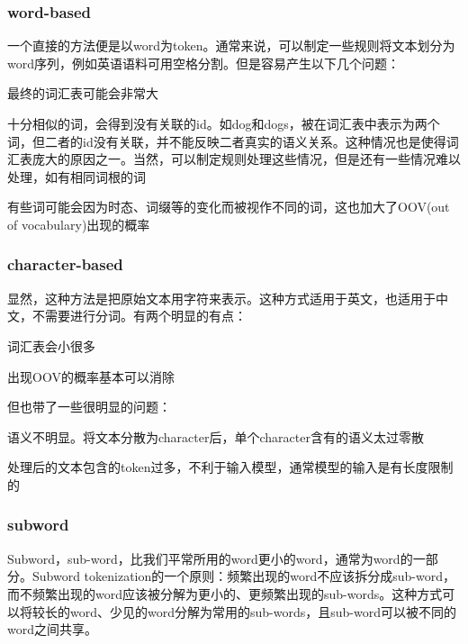 \subsubsection{word-based}
一个直接的方法便是以word为token。通常来说，可以制定一些规则将文本划分为word序列，例如英语语料可用空格分割。但是容易产生以下几个问题：
\begin{myitemize}
	\item 最终的词汇表可能会非常大
	\item 十分相似的词，会得到没有关联的id。如dog和dogs，被在词汇表中表示为两个词，但二者的id没有关联，并不能反映二者真实的语义关系。这种情况也是使得词汇表庞大的原因之一。当然，可以制定规则处理这些情况，但是还有一些情况难以处理，如有相同词根的词
	\item 有些词可能会因为时态、词缀等的变化而被视作不同的词，这也加大了OOV(out of vocabulary)出现的概率	
\end{myitemize}

\subsubsection{character-based}
显然，这种方法是把原始文本用字符来表示。这种方式适用于英文，也适用于中文，不需要进行分词。有两个明显的有点：
\begin{myitemize}
	\item 词汇表会小很多
	\item 出现OOV的概率基本可以消除
\end{myitemize}
但也带了一些很明显的问题：
\begin{myitemize}
	\item 语义不明显。将文本分散为character后，单个character含有的语义太过零散
	\item 处理后的文本包含的token过多，不利于输入模型，通常模型的输入是有长度限制的
\end{myitemize}

\subsubsection{subword}
Subword，sub-word，比我们平常所用的word更小的word，通常为word的一部分。Subword tokenization的一个原则：频繁出现的word不应该拆分成sub-word，而不频繁出现的word应该被分解为更小的、更频繁出现的sub-words。这种方式可以将较长的word、少见的word分解为常用的sub-words，且sub-word可以被不同的word之间共享。